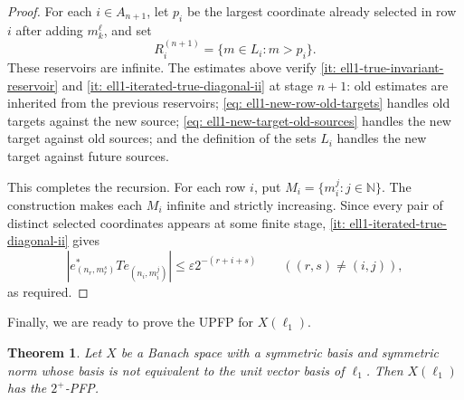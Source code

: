 \documentclass[11pt]{amsart}
\theoremstyle{plain}
\newtheorem{theorem}{Theorem}[section]
\theoremstyle{definition}
\numberwithin{equation}{section}
\newcommand{\N}{\mathbb{N}}
\renewcommand{\leq}{\leqslant}
\begin{document}
\begin{proof}
    For each $i\in A_{n+1}$, let $p_i$ be the largest coordinate already selected in row $i$ after adding $m_k^\ell$, and set
    \begin{equation*}
        R_i^{(n+1)}=\{m\in L_i:m>p_i\}.
    \end{equation*}
    These reservoirs are infinite. The estimates above verify \ref{it: ell1-true-invariant-reservoir} and \ref{it: ell1-iterated-true-diagonal-ii} at stage $n+1$: old estimates are inherited from the previous reservoirs; \eqref{eq: ell1-new-row-old-targets} handles old targets against the new source; \eqref{eq: ell1-new-target-old-sources} handles the new target against old sources; and the definition of the sets $L_i$ handles the new target against future sources.

    This completes the recursion. For each row $i$, put $M_i=\{m_i^j:j\in\N\}$. The construction makes each $M_i$ infinite and strictly increasing. Since every pair of distinct selected coordinates appears at some finite stage, \ref{it: ell1-iterated-true-diagonal-ii} gives
    \begin{equation*}
        |e^*_{(n_r,m_r^s)}T e_{(n_i,m_i^j)}|
        \leq \varepsilon2^{-(r+i+s)}
        \qquad ((r,s)\neq(i,j)),
    \end{equation*}
    as required.
\end{proof}

Finally, we are ready to prove the UPFP for $X(\ell_1)$.

\begin{theorem}\label{th: l_1-iterated}
    Let $X$ be a Banach space with a symmetric basis and symmetric norm whose basis is not equivalent to the unit vector basis of $\ell_1$. Then $X(\ell_1)$ has the $2^+$-PFP.
\end{theorem}
\end{document}
